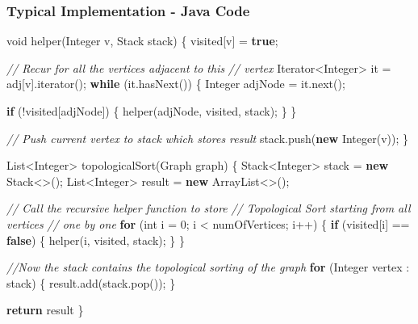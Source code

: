\documentclass[]{book}
\newenvironment{Shaded}{\begin{snugshade}}{\end{snugshade}}
\newcommand{\BuiltInTok}[1]{#1}
\newcommand{\CommentTok}[1]{\textcolor[rgb]{0.56,0.35,0.01}{\textit{#1}}}
\newcommand{\DataTypeTok}[1]{\textcolor[rgb]{0.13,0.29,0.53}{#1}}
\newcommand{\DecValTok}[1]{\textcolor[rgb]{0.00,0.00,0.81}{#1}}
\newcommand{\FunctionTok}[1]{\textcolor[rgb]{0.00,0.00,0.00}{#1}}
\newcommand{\KeywordTok}[1]{\textcolor[rgb]{0.13,0.29,0.53}{\textbf{#1}}}
\newcommand{\NormalTok}[1]{#1}
\begin{document}
\subsubsection{Typical Implementation - Java Code}

\begin{Shaded}
\begin{Highlighting}[]
\DataTypeTok{void} \FunctionTok{helper}\NormalTok{(}\BuiltInTok{Integer}\NormalTok{ v, }\BuiltInTok{Stack}\NormalTok{ stack) \{}
\NormalTok{    visited[v] = }\KeywordTok{true}\NormalTok{;}

    \CommentTok{// Recur for all the vertices adjacent to this}
    \CommentTok{// vertex}
    \BuiltInTok{Iterator}\NormalTok{<}\BuiltInTok{Integer}\NormalTok{> it = adj[v].}\FunctionTok{iterator}\NormalTok{();}
    \KeywordTok{while}\NormalTok{ (it.}\FunctionTok{hasNext}\NormalTok{()) \{}
        \BuiltInTok{Integer}\NormalTok{ adjNode = it.}\FunctionTok{next}\NormalTok{();}

        \KeywordTok{if}\NormalTok{ (!visited[adjNode])  \{}
            \FunctionTok{helper}\NormalTok{(adjNode, visited, stack);}
\NormalTok{        \}}
\NormalTok{    \}}

    \CommentTok{// Push current vertex to stack which stores result}
\NormalTok{    stack.}\FunctionTok{push}\NormalTok{(}\KeywordTok{new} \BuiltInTok{Integer}\NormalTok{(v));}
\NormalTok{\}}

\BuiltInTok{List}\NormalTok{<}\BuiltInTok{Integer}\NormalTok{> }\FunctionTok{topologicalSort}\NormalTok{(Graph graph) \{}
    \BuiltInTok{Stack}\NormalTok{<}\BuiltInTok{Integer}\NormalTok{> stack = }\KeywordTok{new} \BuiltInTok{Stack}\NormalTok{<>();}
    \BuiltInTok{List}\NormalTok{<}\BuiltInTok{Integer}\NormalTok{> result = }\KeywordTok{new} \BuiltInTok{ArrayList}\NormalTok{<>();}

    \CommentTok{// Call the recursive helper function to store}
    \CommentTok{// Topological Sort starting from all vertices}
    \CommentTok{// one by one}
    \KeywordTok{for}\NormalTok{ (}\DataTypeTok{int}\NormalTok{ i = }\DecValTok{0}\NormalTok{; i < numOfVertices; i++) \{}
        \KeywordTok{if}\NormalTok{ (visited[i] == }\KeywordTok{false}\NormalTok{)  \{}
            \FunctionTok{helper}\NormalTok{(i, visited, stack);}
\NormalTok{        \}}
\NormalTok{    \}}

    \CommentTok{//Now the stack contains the topological sorting of the graph}
    \KeywordTok{for}\NormalTok{ (}\BuiltInTok{Integer}\NormalTok{ vertex : stack) \{}
\NormalTok{        result.}\FunctionTok{add}\NormalTok{(stack.}\FunctionTok{pop}\NormalTok{());}
\NormalTok{    \}}

    \KeywordTok{return}\NormalTok{ result}
\NormalTok{\}}
\end{Highlighting}
\end{Shaded}
\end{document}
